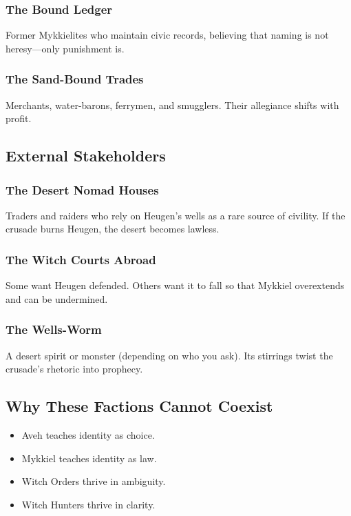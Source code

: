 \documentclass[11pt]{book}
\begin{document}
\subsubsection{The Bound Ledger}
Former Mykkielites who maintain civic records, believing that naming is not heresy---only punishment is.

\subsubsection{The Sand-Bound Trades}
Merchants, water-barons, ferrymen, and smugglers.  
Their allegiance shifts with profit.

\subsection{External Stakeholders}

\subsubsection{The Desert Nomad Houses}
Traders and raiders who rely on Heugen's wells as a rare source of civility.  
If the crusade burns Heugen, the desert becomes lawless.

\subsubsection{The Witch Courts Abroad}
Some want Heugen defended.  
Others want it to fall so that Mykkiel overextends and can be undermined.

\subsubsection{The Wells-Worm}
A desert spirit or monster (depending on who you ask).  
Its stirrings twist the crusade's rhetoric into prophecy.

\subsection{Why These Factions Cannot Coexist}

\begin{itemize}[leftmargin=*]
    \item Aveh teaches identity as choice.  
    \item Mykkiel teaches identity as law.  
    \item Witch Orders thrive in ambiguity.  
    \item Witch Hunters thrive in clarity.  
\end{itemize}
\end{document}
